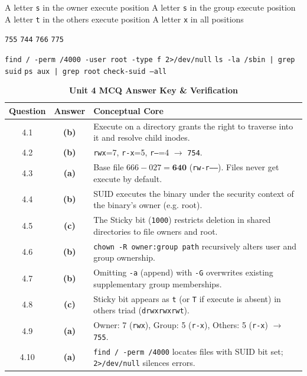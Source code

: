 {A letter \texttt{s} in the owner execute position}
{A letter \texttt{s} in the group execute position}
{A letter \texttt{t} in the others execute position}
{A letter \texttt{x} in all positions}

{\texttt{755}}
{\texttt{744}}
{\texttt{766}}
{\texttt{775}}

{\texttt{find / -perm /4000 -user root -type f 2>/dev/null}}
{\texttt{ls -la /sbin | grep suid}}
{\texttt{ps aux | grep root}}
{\texttt{check-suid --all}}

\begin{table}[htbp]
\centering
\caption{\textbf{Unit 4 MCQ Answer Key \& Verification}}
\begin{tabularx}{0.85\linewidth}{c c X}
\toprule
\textbf{Question} & \textbf{Answer} & \textbf{Conceptual Core} \\
\midrule
4.1 & \textbf{(b)} & Execute on a directory grants the right to traverse into it and resolve child inodes. \\
4.2 & \textbf{(b)} & \texttt{rwx}=7, \texttt{r-x}=5, \texttt{r--}=4 $\to$ \texttt{754}. \\
4.3 & \textbf{(a)} & Base file $666 - 027 = \mathbf{640}$ (\texttt{rw-r-----}). Files never get execute by default. \\
4.4 & \textbf{(b)} & SUID executes the binary under the security context of the binary's owner (e.g. root). \\
4.5 & \textbf{(c)} & The Sticky bit (\texttt{1000}) restricts deletion in shared directories to file owners and root. \\
4.6 & \textbf{(b)} & \texttt{chown -R owner:group path} recursively alters user and group ownership. \\
4.7 & \textbf{(b)} & Omitting \texttt{-a} (append) with \texttt{-G} overwrites existing supplementary group memberships. \\
4.8 & \textbf{(c)} & Sticky bit appears as \texttt{t} (or \texttt{T} if execute is absent) in others triad (\texttt{drwxrwxrwt}). \\
4.9 & \textbf{(a)} & Owner: 7 (\texttt{rwx}), Group: 5 (\texttt{r-x}), Others: 5 (\texttt{r-x}) $\to$ \texttt{755}. \\
4.10 & \textbf{(a)} & \texttt{find / -perm /4000} locates files with SUID bit set; \texttt{2>/dev/null} silences errors. \\
\bottomrule
\end{tabularx}
\end{table}

